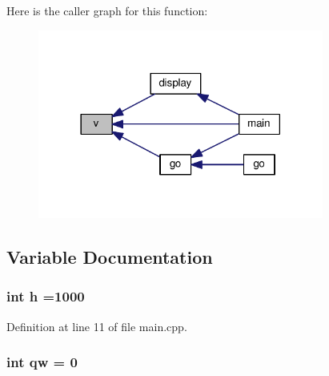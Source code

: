 Here is the caller graph for this function\+:
\nopagebreak
\begin{figure}[H]
\begin{center}
\leavevmode
\includegraphics[width=266pt]{_parametric_2_starling-_simulation_2src_2main_8cpp_a3acab400bf3b180630e37bb94c8ca2d2_icgraph}
\end{center}
\end{figure}




\subsection{Variable Documentation}
\subsubsection[{\texorpdfstring{h}{h}}]{\setlength{\rightskip}{0pt plus 5cm}int h =1000}\hypertarget{_parametric_2_starling-_simulation_2src_2main_8cpp_a16611451551e3d15916bae723c3f59f7}{}\label{_parametric_2_starling-_simulation_2src_2main_8cpp_a16611451551e3d15916bae723c3f59f7}


Definition at line 11 of file main.\+cpp.

\subsubsection[{\texorpdfstring{qw}{qw}}]{\setlength{\rightskip}{0pt plus 5cm}int qw = 0}\hypertarget{_parametric_2_starling-_simulation_2src_2main_8cpp_a15c345fe9f305bd944060d6a5820ab55}{}\label{_parametric_2_starling-_simulation_2src_2main_8cpp_a15c345fe9f305bd944060d6a5820ab55}


